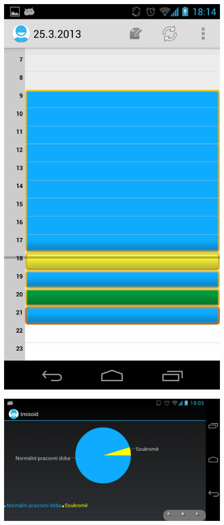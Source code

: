 \documentclass{bakalarka}
\begin{document}
\appendix

%

\begin{figure}[H]
  \centering
  \includegraphics[scale=0.3]{scr/time_doch.png}
  \label{}
\end{figure}

\begin{figure}[H]
  \centering
  \includegraphics[scale=0.3]{scr/graf_doch.png}
  \label{}
\end{figure}
\end{document}
